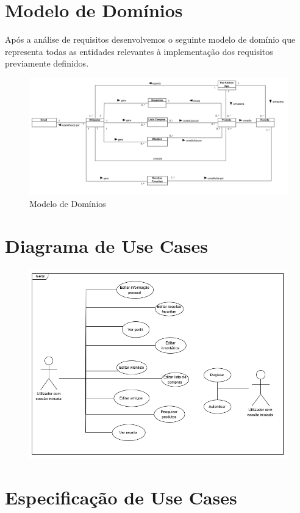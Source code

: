 \documentclass[a4paper]{report}
\begin{document}
\chapter{Modelo de Domínios}
Após a análise de requisitos desenvolvemos o seguinte modelo de domínio que
representa todas as entidades relevantes à implementação dos requisitos
previamente definidos.
\begin{figure}[H]
    \centering
        \includegraphics[width=\textwidth]{images/modelo_dominios.png}
        \caption{Modelo de Domínios}
\end{figure}

\chapter{Diagrama de Use Cases}
    \begin{figure}[H]
    \centering
        \includegraphics[width=\textwidth]{images/diagrama_use_cases.png}
    \end{figure}

\chapter{Especificação de Use Cases}
\end{document}
